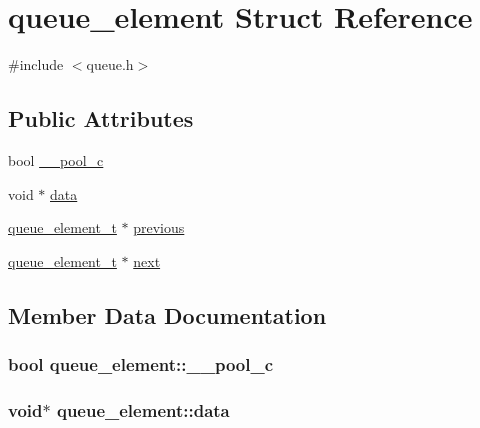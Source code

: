 \hypertarget{structqueue__element}{}\section{queue\+\_\+element Struct Reference}
\label{structqueue__element}


{\ttfamily \#include $<$queue.\+h$>$}

\subsection*{Public Attributes}
\begin{DoxyCompactItemize}
\item 
bool \hyperlink{structqueue__element_a0fff326ce49f568a0e82976295311814}{\+\_\+\+\_\+pool\+\_\+c}
\item 
void $\ast$ \hyperlink{structqueue__element_abcbb56ab1b1d099d345f18b16afaa0de}{data}
\item 
\hyperlink{queue_8h_a518d6a11a5588433b3b1bd1303df78ad}{queue\+\_\+element\+\_\+t} $\ast$ \hyperlink{structqueue__element_af0eb3333c8ba1fed6e9e15e03d286b93}{previous}
\item 
\hyperlink{queue_8h_a518d6a11a5588433b3b1bd1303df78ad}{queue\+\_\+element\+\_\+t} $\ast$ \hyperlink{structqueue__element_a2c7d89dd72af6c9b1b17b89997178954}{next}
\end{DoxyCompactItemize}


\subsection{Member Data Documentation}
\hypertarget{structqueue__element_a0fff326ce49f568a0e82976295311814}{}
\subsubsection[{\+\_\+\+\_\+pool\+\_\+c}]{\setlength{\rightskip}{0pt plus 5cm}bool queue\+\_\+element\+::\+\_\+\+\_\+pool\+\_\+c}\label{structqueue__element_a0fff326ce49f568a0e82976295311814}
\hypertarget{structqueue__element_abcbb56ab1b1d099d345f18b16afaa0de}{}
\subsubsection[{data}]{\setlength{\rightskip}{0pt plus 5cm}void$\ast$ queue\+\_\+element\+::data}\label{structqueue__element_abcbb56ab1b1d099d345f18b16afaa0de}
\hypertarget{structqueue__element_a2c7d89dd72af6c9b1b17b89997178954}{}
